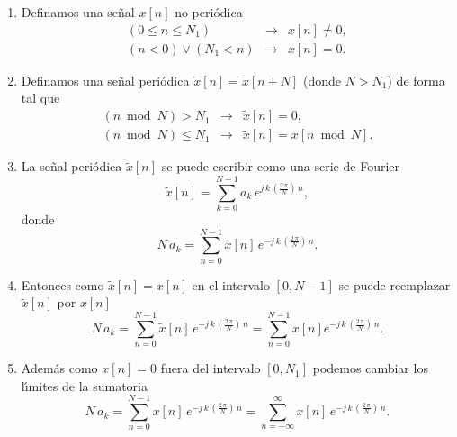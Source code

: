 \begin{enumerate}

\item   Definamos una se\~{n}al $x\left[ n\right] $ no peri\'{o}dica  
\begin{eqnarray}
  \left( 0\leq n\leq N_{1}\right)                         &\rightarrow    & x\left[ n\right] \neq 0, \\
  \left( n < 0\right) \vee \left( N_{1} < n\right)            &\rightarrow    & x\left[ n\right] =0.
\end{eqnarray}

\item   Definamos una se\~{n}al peri\'{o}dica $\tilde{x}\left[ n\right] =\tilde{x}\left[ n+N\right]$ 
(donde $N > N_{1}$) de forma tal que 
\begin{eqnarray}
 \left( n \bmod N\right) > N_{1}         &\rightarrow& \tilde{x}\left[ n\right] =0, \\ 
 \left( n \bmod N\right) \leq N_{1}      &\rightarrow& \tilde{x}\left[ n\right] = x \left[ n\bmod N\right].
\end{eqnarray}

\item   La se\~{n}al peri\'{o}dica $\tilde{x}\left[ n\right]$ se puede escribir como una serie de Fourier 
\begin{equation}
        \tilde{x}\left[ n\right] =\sum_{k=0}^{N-1}a_{k} \, e^{j \, k \, \left( \frac{2 \, \pi}{N}\right) \, n},
\end{equation}
donde 
\begin{equation}
  N \, a_{k} = \sum_{n=0}^{N-1}\tilde{x}\left[ n\right] \, e^{-j \, k \, \left( \frac{2 \, \pi}{N}\right) \, n}.
\end{equation}

\item Entonces como $\tilde{x}\left[ n\right] =x\left[ n\right] $ en el intervalo $[0,N-1]$ se puede 
reemplazar $\tilde{x}\left[ n\right] $ por $x\left[ n\right]$ 
\begin{equation}
  N \, a_{k}=
  \sum_{n=0}^{N-1}\tilde{x}\left[ n\right] \, e^{-j \, k \, \left( \frac{2 \, \pi }{N}\right) \, n}
  =
  \sum_{n=0}^{N-1}x\left[ n\right] e^{-j \, k \, \left( \frac{2 \, \pi}{N}\right) \, n}.
\end{equation}

\item Adem\'{a}s como $x\left[ n\right] =0$ fuera del intervalo $\left[ 0,N_{1}\right]$ podemos cambiar 
los l\'{\i}mites de la sumatoria 
\begin{equation}
  N \, a_{k}=
  \sum_{n=0}^{N-1}x\left[ n\right] \, e^{-j \, k \, \left( \frac{2 \, \pi}{N}\right) \, n}=
  \sum_{n=-\infty }^{\infty }x\left[ n\right] \, e^{-j \, k \, \left( \frac{2 \, \pi }{N}\right) \, n}.
\end{equation}


\end{enumerate}
